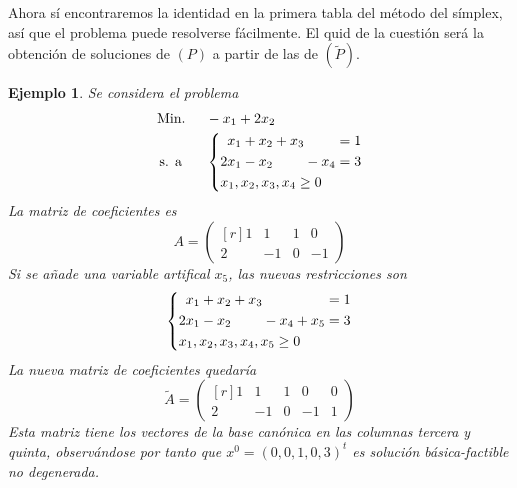 \documentclass[11pt]{report}
\theoremstyle{mytheorem}
\theoremstyle{mydefinition}
\theoremstyle{myexample}
\newtheorem*{example}{Ejemplo}
\begin{document}
Ahora sí encontraremos la identidad en la primera tabla del método del símplex, así que el problema puede resolverse fácilmente. El quid de la cuestión será la obtención de soluciones de $(P)$ a partir de las de $(\tilde{P})$.

\begin{example}
Se considera el problema
\[\begin{aligned}[t]
&\text{Min. } && -x_1+2x_2 \\
& \, \text{s. a} && \left\{\begin{alignedat}{10}
&  &x_1 & {}+{} & x_2 & {}+{} & x_3 &       &     & {}={} 1 \\
& 2&x_1 & {}-{} & x_2 &       &     & {}-{} & x_4 & {}={} 3 \\
& \mathrlap{x_1,x_2,x_3,x_4 \geq 0}
\end{alignedat}\right.
\end{aligned}\]
La matriz de coeficientes es
\[A = \begin{pmatrix*}[r]
    1 & 1 & 1 & 0 \\
    2 & -1 & 0 & -1
\end{pmatrix*}\]
Si se añade una variable artifical $x_5$, las nuevas restricciones son
\[\left\{\begin{alignedat}{10}
&  &x_1 & {}+{} & x_2 & {}+{} & x_3 &       &     &       &     & {}={} 1 \\
& 2&x_1 & {}-{} & x_2 &       &     & {}-{} & x_4 & {}+{} & x_5 & {}={} 3 \\
& \mathrlap{x_1,x_2,x_3,x_4,x_5 \geq 0}
\end{alignedat}\right.\]
La nueva matriz de coeficientes quedaría
\[\tilde{A} = \begin{pmatrix*}[r]
    1 & 1 & 1 & 0 & 0 \\
    2 & -1 & 0 & -1 & 1
\end{pmatrix*}\]
Esta matriz tiene los vectores de la base canónica en las columnas tercera y quinta, observándose por tanto que $x^0 = (0,0,1,0,3)^t$ es solución básica-factible no degenerada.
\end{example}
\end{document}
